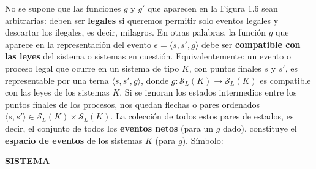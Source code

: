 {No se supone que las funciones $g$ y $g'$ que aparecen en la Figura 1.6 sean arbitrarias: deben ser \textbf{legales} si queremos permitir solo eventos legales y descartar los ilegales, es decir, milagros. En otras palabras, la función $g$ que aparece en la representación del evento $e = \langle s, s', g \rangle$ debe ser \textbf{compatible con las leyes} del sistema o sistemas en cuestión. Equivalentemente: un evento o proceso legal que ocurre en un sistema de tipo $K$, con puntos finales $s$ y $s'$, es representable por una terna $\langle s, s', g \rangle$, donde $g: \mathcal{S}_L(K) \rightarrow \mathcal{S}_L(K)$ es compatible con las leyes de los sistemas $K$. Si se ignoran los estados intermedios entre los puntos finales de los procesos, nos quedan flechas o pares ordenados $\langle s, s' \rangle \in \mathcal{S}_L(K) \times \mathcal{S}_L(K)$. La colección de todos estos pares de estados, es decir, el conjunto de todos los \textbf{eventos netos} (para un $g$ dado), constituye el \textbf{espacio de eventos} de los sistemas $K$ (para $g$). Símbolo:
}

\newpage
\fancyhf{}
\fancyhead[r]{\thepage}
\begin{center}
{\fontsize{13}{16}\selectfont \textbf{SISTEMA}}
\end{center}
\vspace{0.5cm}


